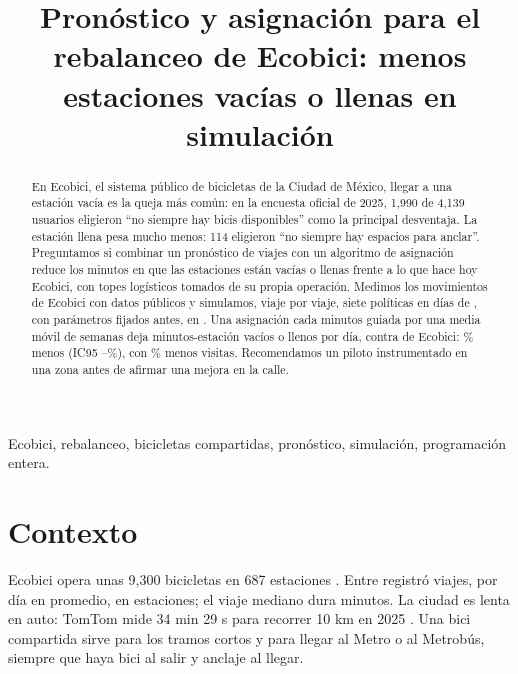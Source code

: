 \documentclass[conference,letterpaper,10pt]{IEEEtran}
\begin{document}
\raggedbottom
\title{Pronóstico y asignación para el rebalanceo de Ecobici: menos estaciones vacías o llenas en simulación}
\author{}
\maketitle

\begin{abstract}
En Ecobici, el sistema público de bicicletas de la Ciudad de México, llegar a una estación vacía es la queja más común: en la encuesta oficial de 2025, 1,990 de 4,139 usuarios eligieron ``no siempre hay bicis disponibles'' como la principal desventaja. La estación llena pesa mucho menos: 114 eligieron ``no siempre hay espacios para anclar''. Preguntamos si combinar un pronóstico de viajes con un algoritmo de asignación reduce los minutos en que las estaciones están vacías o llenas frente a lo que hace hoy Ecobici, con topes logísticos tomados de su propia operación. Medimos los movimientos de Ecobici con datos públicos y simulamos, viaje por viaje, siete políticas en \rdias{} días de \rpruebaPeriodo, con parámetros fijados antes, en \rselMes. Una asignación cada \rstepMin{} minutos guiada por una media móvil de \rsemanasHist{} semanas deja \rmaEF{} minutos-estación vacíos o llenos por día, contra \recoEF{} de Ecobici: \rmaPct\% menos (IC95 \rmaPctLo--\rmaPctHi\%), con \rmaVisPct\% menos visitas. Recomendamos un piloto instrumentado en una zona antes de afirmar una mejora en la calle.
\end{abstract}
\begin{IEEEkeywords}
Ecobici, rebalanceo, bicicletas compartidas, pronóstico, simulación, programación entera.
\end{IEEEkeywords}

\section{Contexto}
Ecobici opera unas 9,300 bicicletas en 687 estaciones \cite{expansion2026}. Entre \rdatosPeriodo{} registró \rviajes{} viajes, \rviajesDia{} por día en promedio, en \restaciones{} estaciones; el viaje mediano dura \rdurMed{} minutos. La ciudad es lenta en auto: TomTom mide 34 min 29 s para recorrer 10 km en 2025 \cite{tomtom2025}. Una bici compartida sirve para los tramos cortos y para llegar al Metro o al Metrobús, siempre que haya bici al salir y anclaje al llegar.
\end{document}
